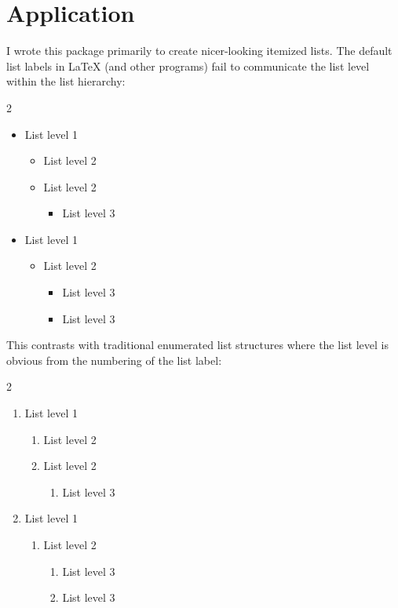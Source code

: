 \documentclass{beerydoc}
\begin{document}
\section{Application}
\label{sec:application}

I wrote this package primarily to create nicer-looking itemized lists.
The default list labels in \LaTeX{} (and other programs) fail to communicate
the list level within the list hierarchy:

\begin{multicols}{2}
  \begin{itemize}[label=\textbullet]
    \item List level 1
    \begin{itemize}[label=\textbf{--}]
      \item List level 2
      \item List level 2
      \begin{itemize}[label=\textasteriskcentered]
        \item List level 3
      \end{itemize}
    \end{itemize}
    \item List level 1
    \begin{itemize}[label=\textbf{--}]
      \item List level 2
      \begin{itemize}[label=\textasteriskcentered]
        \item List level 3
        \item List level 3
      \end{itemize}
    \end{itemize}
  \end{itemize}
\end{multicols}

This contrasts with traditional enumerated list structures where the list
level is obvious from the numbering of the list label:

\begin{multicols}{2}
  \begin{enumerate}
    \item List level 1
    \begin{enumerate}
      \item List level 2
      \item List level 2
      \begin{enumerate}
        \item List level 3
      \end{enumerate}
    \end{enumerate}
    \item List level 1
    \begin{enumerate}
      \item List level 2
      \begin{enumerate}
        \item List level 3
        \item List level 3
      \end{enumerate}
    \end{enumerate}
  \end{enumerate}
\end{multicols}
\end{document}
